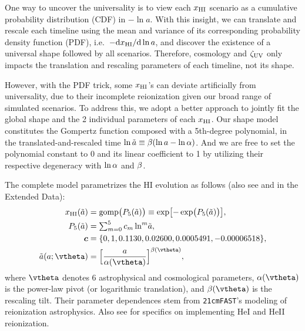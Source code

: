 One way to uncover the universality is to view each $x_{\mathrm{HI}}$ scenario as
a cumulative probability distribution (CDF) in $- \ln a$.
With this insight, we can translate and rescale each timeline using the
mean and variance of its corresponding probability density function
(PDF), i.e.\ $- \mathrm{d}x_{\mathrm{HI}} / \mathrm{d}\ln a$, and discover the
existence of a universal shape followed by all scenarios.
Therefore, cosmology and $\zeta_\mathrm{UV}$ only impacts the translation and
rescaling parameters of each timeline, not its shape.

However, with the PDF trick, some $x_{\mathrm{HI}}$'s can deviate artificially
from universality, due to their incomplete reionization given our broad
range of simulated scenarios.
To address this, we adopt a better approach to jointly fit the global
shape and the 2 individual parameters of each $x_{\mathrm{HI}}$.
Our shape model constitutes the Gompertz function composed with a
5th-degree polynomial, in the translated-and-rescaled time $\ln\tilde{a}
\equiv \beta (\ln a - \ln\alpha)$.
And we are free to set the polynomial constant to 0 and its linear
coefficient to 1 by utilizing their respective degeneracy with $\ln\alpha$
and $\beta$.

The complete model parametrizes the HI evolution as follows (also see
 and  in the Extended Data):
%
\begin{align}
\label{eq:uni}
x_\HI(\ar) &= \gomp\bigl( P_5(\ar) \bigr)
  \equiv \exp\bigl[ - \exp\bigl( P_5(\ar) \bigr) \bigr], \\
%
\label{eq:poly}
P_5(\ar) &= {\textstyle\sum}_{m=0}^5 \, c_m \ln^m\!\ar, \\
%
\bm{c} &= \{0, 1, 0.1130, 0.02600, 0.0005491, -0.00006518\}, \nonumber\\
%
\label{eq:map}
\ar(a; \vtheta) &= \Bigl[ \frac{a}{\ap(\vtheta)} \Bigr]^{\tilt(\vtheta)},
\end{align}
%
where $\vtheta$ denotes 6 astrophysical and cosmological parameters,
$\ap(\vtheta)$ is the power-law pivot (or logarithmic translation), and
$\tilt(\vtheta)$ is the rescaling tilt.
Their parameter dependences stem from \texttt{21cmFAST}'s modeling of
reionization astrophysics.
Also see  for specifics on implementing HeI and
HeII reionization.

